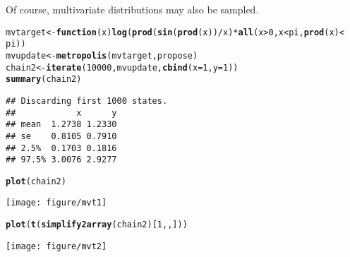 \documentclass{article}\usepackage[]{graphicx}\usepackage[]{color}
\makeatletter
\def\maxwidth{ %
  \ifdim\Gin@nat@width>\linewidth
    \linewidth
  \else
    \Gin@nat@width
  \fi
}
\newcommand{\hlnum}[1]{\textcolor[rgb]{0.686,0.059,0.569}{#1}}%
\newcommand{\hlopt}[1]{\textcolor[rgb]{0,0,0}{#1}}%
\newcommand{\hlstd}[1]{\textcolor[rgb]{0.345,0.345,0.345}{#1}}%
\newcommand{\hlkwa}[1]{\textcolor[rgb]{0.161,0.373,0.58}{\textbf{#1}}}%
\newcommand{\hlkwb}[1]{\textcolor[rgb]{0.69,0.353,0.396}{#1}}%
\newcommand{\hlkwc}[1]{\textcolor[rgb]{0.333,0.667,0.333}{#1}}%
\newcommand{\hlkwd}[1]{\textcolor[rgb]{0.737,0.353,0.396}{\textbf{#1}}}%
\newenvironment{kframe}{%
 \def\at@end@of@kframe{}%
 \ifinner\ifhmode%
  \def\at@end@of@kframe{\end{minipage}}%
  \begin{minipage}{\columnwidth}%
 \fi\fi%
 \def\FrameCommand##1{\hskip\@totalleftmargin \hskip-\fboxsep
 \colorbox{shadecolor}{##1}\hskip-\fboxsep
     \hskip-\linewidth \hskip-\@totalleftmargin \hskip\columnwidth}%
 \MakeFramed {\advance\hsize-\width
   \@totalleftmargin\z@ \linewidth\hsize
   \@setminipage}}%
 {\par\unskip\endMakeFramed%
 \at@end@of@kframe}
\newenvironment{knitrout}{}{} %
\makeatother
\begin{document}
Of course, multivariate distributions may also be sampled. 
\begin{knitrout}
\color{fgcolor}\begin{kframe}
\begin{alltt}
\hlstd{mvtarget} \hlkwb{<-} \hlkwa{function}\hlstd{(}\hlkwc{x}\hlstd{)} \hlkwd{log}\hlstd{(}\hlkwd{prod}\hlstd{(}\hlkwd{sin}\hlstd{(}\hlkwd{prod}\hlstd{(x))}\hlopt{/}\hlstd{x)} \hlopt{*} \hlkwd{all}\hlstd{(x} \hlopt{>} \hlnum{0}\hlstd{, x} \hlopt{<} \hlstd{pi,} \hlkwd{prod}\hlstd{(x)} \hlopt{<}
    \hlstd{pi))}
\hlstd{mvupdate} \hlkwb{<-} \hlkwd{metropolis}\hlstd{(mvtarget, propose)}
\hlstd{chain2} \hlkwb{<-} \hlkwd{iterate}\hlstd{(}\hlnum{10000}\hlstd{, mvupdate,} \hlkwd{cbind}\hlstd{(}\hlkwc{x} \hlstd{=} \hlnum{1}\hlstd{,} \hlkwc{y} \hlstd{=} \hlnum{1}\hlstd{))}
\hlkwd{summary}\hlstd{(chain2)}
\end{alltt}
\begin{verbatim}
## Discarding first 1000 states.
##            x      y
## mean  1.2738 1.2330
## se    0.8105 0.7910
## 2.5%  0.1703 0.1816
## 97.5% 3.0076 2.9277
\end{verbatim}
\begin{alltt}
\hlkwd{plot}\hlstd{(chain2)}
\end{alltt}
\end{kframe}
\texttt{[image: figure/mvt1]} 
\begin{kframe}\begin{alltt}
\hlkwd{plot}\hlstd{(}\hlkwd{t}\hlstd{(}\hlkwd{simplify2array}\hlstd{(chain2)[}\hlnum{1}\hlstd{, , ]))}
\end{alltt}
\end{kframe}
\texttt{[image: figure/mvt2]} 

\end{knitrout}
\end{document}
